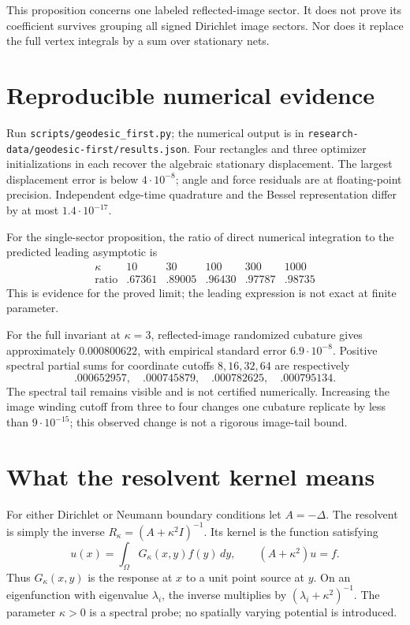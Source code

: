 \documentclass[11pt]{article}
\begin{document}
This proposition concerns one labeled reflected-image sector. It
does not prove its coefficient survives grouping all signed
Dirichlet image sectors. Nor does it replace the full vertex
integrals by a sum over stationary nets.

\section{Reproducible numerical evidence}
Run \texttt{scripts/geodesic\_first.py}; the numerical output is in
\texttt{research-data/geodesic-first/results.json}.
Four rectangles and three optimizer initializations in each recover
the algebraic stationary displacement. The largest displacement
error is below $4\cdot10^{-8}$; angle and force residuals are at
floating-point precision. Independent edge-time quadrature and the
Bessel representation differ by at most $1.4\cdot10^{-17}$.

For the single-sector proposition, the ratio of direct numerical
integration to the predicted leading asymptotic is
\[
\begin{array}{c|rrrrr}
\kappa&10&30&100&300&1000\\ \hline
\text{ratio}&.67361&.89005&.96430&.97787&.98735
\end{array}
\]
This is evidence for the proved limit; the leading expression is
not exact at finite parameter.

For the full invariant at $\kappa=3$, reflected-image randomized
cubature gives approximately $0.000800622$, with empirical standard
error $6.9\cdot10^{-8}$. Positive spectral partial sums for coordinate
cutoffs $8,16,32,64$ are respectively
\[
 .000652957,\quad .000745879,\quad .000782625,\quad .000795134.
\]
The spectral tail remains visible and is not certified numerically.
Increasing the image winding cutoff from three to four changes one
cubature replicate by less than $9\cdot10^{-15}$; this observed change
is not a rigorous image-tail bound.

\section{What the resolvent kernel means}
For either Dirichlet or Neumann boundary conditions let $A=-\Delta$.
The resolvent is simply the inverse $R_\kappa=(A+\kappa^2I)^{-1}$.
Its kernel is the function satisfying
\[
 u(x)=\int_\Omega G_\kappa(x,y)f(y)\,dy,
 \qquad (A+\kappa^2)u=f.
\]
Thus $G_\kappa(x,y)$ is the response at $x$ to a unit point source at
$y$. On an eigenfunction with eigenvalue $\lambda_i$, the inverse
multiplies by $(\lambda_i+\kappa^2)^{-1}$. The parameter $\kappa>0$
is a spectral probe; no spatially varying potential is introduced.
\end{document}
